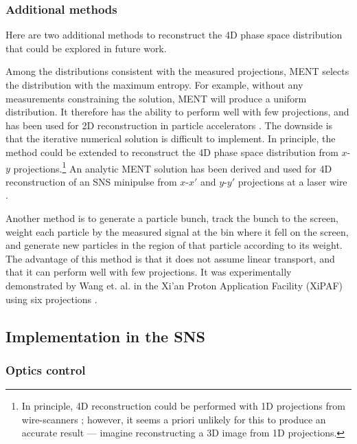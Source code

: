 \subsubsection{Additional methods}

Here are two additional methods to reconstruct the 4D phase space distribution that could be explored in future work.

Among the distributions consistent with the measured projections, MENT selects the distribution with the maximum entropy. For example, without any measurements constraining the solution, MENT will produce a uniform distribution. It therefore has the ability to perform well with few projections, and has been used for 2D reconstruction in particle accelerators \cite{Hock2013a}. The downside is that the iterative numerical solution is difficult to implement. In principle, the method could be extended to reconstruct the 4D phase space distribution from $x$-$y$ projections.\footnote{In principle, 4D reconstruction could be performed with 1D projections from wire-scanners \cite{Sander1979}; however, it seems a priori unlikely for this to produce an accurate result — imagine reconstructing a 3D image from 1D projections.} An analytic MENT solution has been derived and used for 4D reconstruction of an SNS minipulse from $x$-$x'$ and $y$-$y'$ projections at a laser wire \cite{Wong-forthcoming}. 

Another method is to generate a particle bunch, track the bunch to the screen, weight each particle by the measured signal at the bin where it fell on the screen, and generate new particles in the region of that particle according to its weight. The advantage of this method is that it does not assume linear transport, and that it can perform well with few projections. It was experimentally demonstrated by Wang et. al. in the Xi’an Proton Application Facility (XiPAF) using six projections \cite{Wang2019}. 



\subsection{Implementation in the SNS}

\subsubsection{Optics control}

